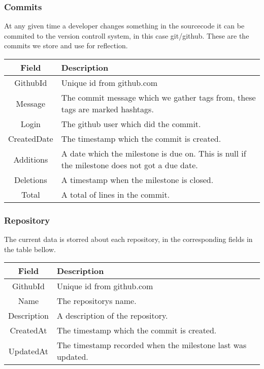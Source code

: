 \subsubsection*{Commits}
At any given time a developer changes something in the sourcecode it can be commited to the version controll system, in this case git/github. These are the commits we store and use for reflection. \\

\vspace{0.5cm}
\begin{tabularx}{\linewidth}{| c | X |}
    \hline
    \rowcolor[gray]{0.8}
    \textbf{Field} & \textbf{Description} \\
    \hline
    GithubId & Unique id from github.com\\ \hline
    Message & The commit message which we gather tags from, these tags are marked hashtags.\\ \hline
   	Login & The github user which did the commit.\\ \hline
    CreatedDate & The timestamp which the commit is created.\\ \hline
    Additions & A date which the milestone is due on. This is null if the milestone does not got a due date.\\ \hline
    Deletions & A timestamp when the milestone is closed.\\ \hline
    Total & A total of lines in the commit.\\
    \hline
\end{tabularx}
\vspace{0.5cm}

\subsubsection*{Repository}
The current data is storred about each repository, in the corresponding fields in the table bellow. \\

\vspace{0.5cm}
\begin{tabularx}{\linewidth}{| c | X |}
    \hline
    \rowcolor[gray]{0.8}
    \textbf{Field} & \textbf{Description} \\
    \hline
    GithubId & Unique id from github.com\\ \hline
    Name & The repositorys name.\\ \hline
   	Description & A description of the repository.\\ \hline
    CreatedAt & The timestamp which the commit is created.\\ \hline
    UpdatedAt & The timestamp recorded when the milestone last was updated.\\ 
    \hline
\end{tabularx}
\vspace{0.5cm}

